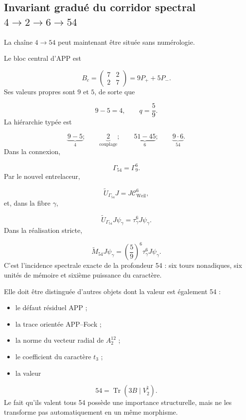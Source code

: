 \subsection{Invariant gradué du corridor spectral \(4\to2\to6\to54\)}
La chaîne \(4\to54\) peut maintenant être située sans numérologie.\par
Le bloc central d'APP est\par
\[
B_c
=
\begin{pmatrix}
7&2\\
2&7
\end{pmatrix}
=
9P_++5P_-.
\]
Ses valeurs propres sont \(9\) et \(5\), de sorte que\par
\[
9-5=4,
\qquad
q=\frac59.
\]
La hiérarchie typée est\par
\[
\underbrace{9-5}_{4};
\qquad
\underbrace{2}_{\text{couplage}};
\qquad
\underbrace{51-45}_{6};
\qquad
\underbrace{9\cdot6}_{54}.
\]
Dans la connexion,\par
\[
\Gamma_{54}=\Gamma_9^6.
\]
Par le nouvel entrelaceur,\par
\[
\widetilde U_{\Gamma_{54}}J
=
J\mathcal C_{\mathrm{Weil}}^6,
\]
et, dans la fibre \(\gamma\),\par
\[
\widetilde U_{\Gamma_{54}}J\psi_\gamma
=
\tau_\gamma^6J\psi_\gamma.
\]
Dans la réalisation stricte,\par
\[
\widetilde M_{54}J\psi_\gamma
=
\left(\frac59\right)^6
\tau_\gamma^6J\psi_\gamma.
\]
C'est l'incidence spectrale exacte de la profondeur 54 : six tours nonadiques, six unités de mémoire et sixième puissance du caractère.\par
Elle doit être distinguée d'autres objets dont la valeur est également 54 :\par
\begin{itemize}
\item le défaut résiduel APP ;
\item la trace orientée APP–Fock ;
\item la norme du vecteur radial de \(A_2^{12}\) ;
\item le coefficient du caractère \(t_3\) ;
\item la valeur
\end{itemize}
  \[
  54=\operatorname{Tr}(3B\mid V^\natural_2).
  \]
Le fait qu'ils valent tous 54 possède une importance structurelle, mais ne les transforme pas automatiquement en un même morphisme.\par
{}
